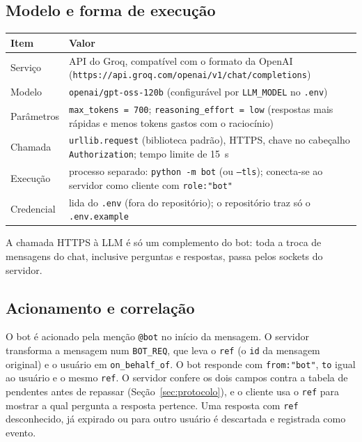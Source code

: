 \documentclass[11pt,a4paper]{article}
\newcommand{\cod}[1]{\texttt{#1}}
\begin{document}
\subsection{Modelo e forma de execução}
\begin{center}
\small
\begin{tabularx}{\linewidth}{l X}
\toprule
\textbf{Item} & \textbf{Valor} \\
\midrule
Serviço        & API do Groq, compatível com o formato da OpenAI
                 (\cod{https://api.groq.com/openai/v1/chat/completions}) \\
Modelo         & \cod{openai/gpt-oss-120b} (configurável por \cod{LLM\_MODEL} no \cod{.env}) \\
Parâmetros     & \cod{max\_tokens = 700}; \cod{reasoning\_effort = low} (respostas mais rápidas e menos
                 tokens gastos com o raciocínio) \\
Chamada        & \cod{urllib.request} (biblioteca padrão), HTTPS, chave no cabeçalho
                 \cod{Authorization}; tempo limite de 15~s \\
Execução       & processo separado: \cod{python -m bot} (ou \cod{--tls}); conecta-se ao servidor como
                 cliente com \cod{role:"bot"} \\
Credencial     & lida do \cod{.env} (fora do repositório); o repositório traz só o \cod{.env.example} \\
\bottomrule
\end{tabularx}
\end{center}
A chamada HTTPS à LLM é só um complemento do bot: toda a troca de mensagens do chat, inclusive
perguntas e respostas, passa pelos sockets do servidor.

\subsection{Acionamento e correlação}
O bot é acionado pela menção \cod{@bot} no início da mensagem. O servidor transforma a mensagem num
\cod{BOT\_REQ}, que leva o \cod{ref} (o \cod{id} da mensagem original) e o usuário em
\cod{on\_behalf\_of}. O bot responde com \cod{from:"bot"}, \cod{to} igual ao usuário e o mesmo
\cod{ref}. O servidor confere os dois campos contra a tabela de pendentes antes de repassar
(Seção~\ref{sec:protocolo}), e o cliente usa o \cod{ref} para mostrar a qual pergunta a resposta
pertence. Uma resposta com \cod{ref} desconhecido, já expirado ou para outro usuário é descartada e
registrada como evento.
\end{document}
